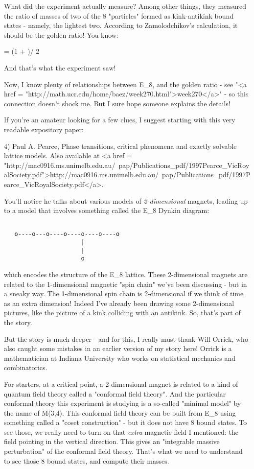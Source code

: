 What did the experiment actually measure?  Among other things,
they measured the ratio of masses of two of the 8 "particles"
formed as kink-antikink bound states - namely, the lightest two.
According to Zamolodchikov's calculation, it should be the golden
ratio!  You know:

\Phi  = (1 + )/ 2

And that's what the experiment saw!

Now, I know plenty of relationships between E_{8}, and the
golden ratio - see "<a href =
"http://math.ucr.edu/home/baez/week270.html">week270</a>" - so
this connection doesn't shock me.  But I sure hope someone explains
the details!

If you're an amateur looking for a few clues, I suggest starting with
this very readable expository paper:

4) Paul A. Pearce, Phase transitions, critical phenomena and exactly
solvable lattice models.  Also available at 
<a href = "http://mac0916.ms.unimelb.edu.au/~pap/Publications_pdf/1997Pearce_VicRoyalSociety.pdf">http://mac0916.ms.unimelb.edu.au/~pap/Publications_pdf/1997Pearce_VicRoyalSociety.pdf</a>.

You'll notice he talks about various models of \emph{2-dimensional} magnets,
leading up to a model that involves something called the E_{8}
Dynkin diagram:


\begin{verbatim}

   o----o---o----o----o----o----o
                      |
                      |
                      o
\end{verbatim}
    
which encodes the structure of the E_{8} lattice.  
These 2-dimensional magnets are related to the 1-dimensional
magnetic "spin chain" we've been discussing - but in a sneaky
way.  The 1-dimensional spin chain is 2-dimensional if we think of time
as an extra dimension!  Indeed I've already been drawing some 
2-dimensional pictures, like the picture of a kink colliding with an
antikink.   So, that's part of the story.  

But the story is much deeper - and for this, I really must thank 
Will Orrick, who also caught some mistakes in an earlier version
of my story here!  Orrick is a mathematician at Indiana University
who works on statistical mechanics and combinatorics.

For starters, at a critical point, a 2-dimensional magnet is related
to a kind of quantum field theory called a "conformal field
theory".  And the particular conformal theory this experiment is
studying is a so-called "minimal model" by the name of
M(3,4).  This conformal field theory can be built from E_{8}
using something called a "coset construction" - but it does
not have 8 bound states.  To see those, we really need to turn on that
\emph{extra} magnetic field I mentioned: the field pointing in the
vertical direction.  This gives an "integrable massive
perturbation" of the conformal field theory.  That's what we need
to understand to see those 8 bound states, and compute their masses.

